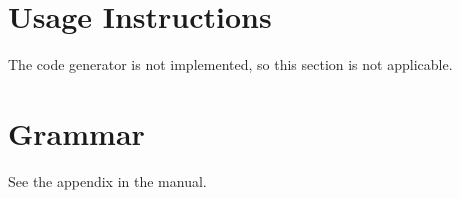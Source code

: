 \documentclass[a4paper, 12pt]{article}
\begin{document}
\section{Usage Instructions}
The code generator is not implemented, so this section is not applicable.

\section{Grammar}
See the appendix in the manual.
\end{document}
